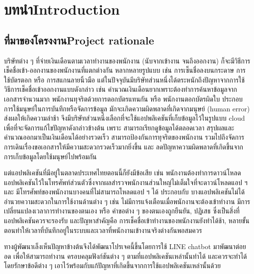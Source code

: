 \chapter{\ifcpe บทนำ\else Introduction\fi}

\section{\ifcpe ที่มาของโครงงาน\else Project rationale\fi}
บริษัทต่าง ๆ ที่จ่ายเงินเดือนตามเวลาทำงานของพนักงาน (นับจากเข้างาน จนถึงออกงาน) ก็จะมีวิธีการเช็คชื่อเข้า-ออกงานของพนักงานที่แตกต่างกัน 
หลากหลายรูปแบบ เช่น การเซ็นชื่อลงบนกระดาษ การใช้บัตรตอก หรือ การสแกนลายนิ้วมือ
แต่ในปัจจุบันมีบริษัทส่วนหนึ่งได้ตระหนักถึงปัญหาจากการใช้วิธีการเช็คชื่อเข้าออกงานแบบดังกล่าว
เช่น คำนวณเงินเดือนยากเพราะต้องทำการค้นหาข้อมูลจากเอกสารจำนวนมาก 
พนักงานทุจริตด้วยการตอกบัตรแทนกัน 
หรือ พนักงานตอกบัตรผิดใบ 
ประกอบการใช้มนุษย์ในการบันทึกหรือจัดการข้อมูล มักจะเกิดความผิดพลาดที่เกิดจากมนุษย์ (human error) 
ส่งผลให้เกิดความล่าช้า 
จึงมีบริษัทส่วนหนึ่งเลือกที่จะใช้แอปพลิเคชันที่เก็บข้อมูลไว้ในรูปแบบ cloud เพื่อที่จะจัดการแก้ไขปัญหาดังกล่าวข้างต้น 
เพราะ สามารถเรียกดูข้อมูลได้ตลอดเวลา 
สรุปผลและคำนวณออกมาเป็นเงินเดือนได้อย่างรวดเร็ว 
สามารถป้องกันการทุจริตของพนักงาน 
รวมไปถึงจัดการการเดินเรื่องขอเอกสารให้มีความสะดวกรวดเร็วมากยิ่งขึ้น และ ลดปัญหาความผิดพลาดที่เกิดขึ้นจากการเก็บข้อมูลโดยใช้มนุษย์ไปพร้อมกัน

แต่แอปพลิเคชันที่มีอยู่ในตลาดประเทศไทยตอนนี้ก็ยังมีข้อเสีย เช่น 
พนักงานต้องทำการดาวน์โหลดแอปพลิเคชันไว้ในโทรศัพท์ส่วนตัวซึ่งจากผลสำรวจพนักงานส่วนใหญ่ไม่เต็มใจที่จะดาวน์โหลดแอป ฯ และ มีโทรศัพท์ของพนักงานบางคนที่ไม่สามารถโหลดแอป ฯ ได้
ประกอบกับ บางแอปพลิเคชันไม่ได้อำนวยความสะดวกในการใช้งานด้านต่าง ๆ เช่น
ไม่มีการแจ้งเตือนเมื่อพนักงานจะต้องเข้าทำงาน มีการเปลี่ยนแปลงเวลาการทำงานของตนเอง หรือ คำขอต่าง ๆ ของตนเองถูกยืนยัน, ปฎิเสธ
ซึ่งเป็นสิ่งที่แอปพลิเคชันควรจะรองรับ 
และปัญหาสำคัญคือ การเช็คชื่อเข้าทำงานของพนักงานยังทำได้ช้า, หลายขั้นตอนทำให้เวลาที่บันทึกอยู่ในระบบและเวลาที่พนักงานเข้างานจริงต่างกันพอสมควร

ทางผู้พัฒนาเล็งเห็นปัญหาข้างต้นจึงได้พัฒนาโปรเจคนี้ขึ้นโดยการใช้ LINE chatbot มาพัฒนาต่อยอด
เพื่อให้สามารถทำงาน ครอบคลุมฟังก์ชันต่าง ๆ ตามที่แอปพลิเคชันเหล่านั้นทำได้ และควรจะทำได้
โดยรักษาข้อดีต่าง ๆ เอาไว้พร้อมกับแก้ปัญหาที่เกิดขึ้นจากการใช้แอปพลิเคชันเหล่านั้นด้วย

